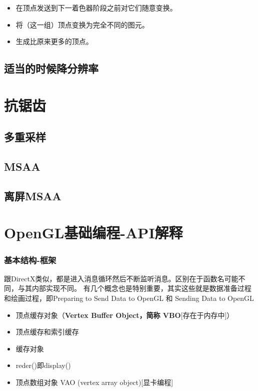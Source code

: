\documentclass[UTF8,a4paper,12pt]{ctexbook}
\begin{document}
		\begin{itemize}[itemindent = 1em]
			\item 在顶点发送到下一着色器阶段之前对它们随意变换。
			\item 将（这一组）顶点变换为完全不同的图元。
			\item 生成比原来更多的顶点。
		\end{itemize}
					
	
	\section{适当的时候降分辨率}		
		
		
		
		
		
		
		
			
\chapter{抗锯齿}
	\section{多重采样}

	\section{MSAA}

	\section{离屏MSAA}


			
			
\chapter{OpenGL基础编程-API解释}
	
	\subsection{基本结构-框架}
		跟DirectX类似，都是进入消息循环然后不断监听消息。区别在于函数名可能不同，与其内部实现不同。
		有几个概念也是特别重要，其实这些就是数据准备过程和绘画过程，即Preparing to Send Data to OpenGL 和 Sending Data to OpenGL
		
		\begin{itemize}
			\item  顶点缓存对象（\textbf{Vertex Buffer Object，简称 VBO}[存在于内存中]）
			\item  顶点缓存和索引缓存
			\item  缓存对象
			\item  reder()即display()
			\item 顶点数组对象 VAO (vertex array object)[显卡编程]
		\end{itemize}
		
\end{document}

